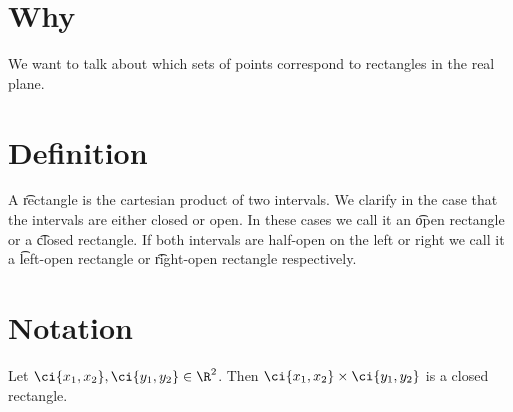 
\section*{Why}

We want to talk about which sets of points correspond to rectangles in the real plane.

\section*{Definition}

A \t{rectangle} is the cartesian product of two intervals.
We clarify in the case that the intervals are either closed or open.
In these cases we call it an \t{open rectangle} or a \t{closed rectangle}.
If both intervals are half-open on the left or right we call it a \t{left-open rectangle} or \t{right-open rectangle} respectively.

\section*{Notation}

Let $\ci{x_1, x_2},\ci{y_1,y_2}\in\R ^2$.
Then $\ci{x_1, x_2} \times  \ci{y_1,y_2}$ is a closed rectangle.

\blankpage